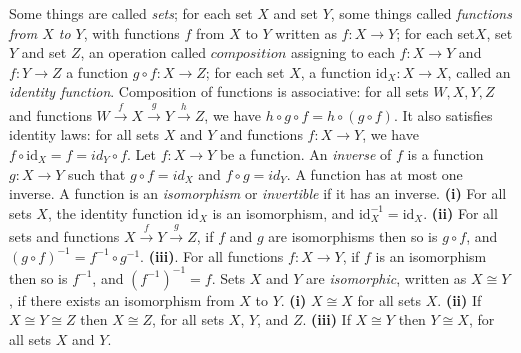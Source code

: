  Some things are called \textit{sets}; for each set $X$ and set $Y$, some things called \textit{functions from $X$ to $Y$}, with functions $f$ from $X$ to $Y$ written as $f \colon X \to Y$; for each set$X$, set $Y$ and set $Z$, an operation called $composition$ assigning to each $f \colon X \to Y$ and $f \colon Y \to Z$ a function $g \circ f \colon X \to Z$; for each set $X$, a function $\text{id}_X \colon X \to X$, called an \textit{identity function}.
 Composition of functions is associative: for all sets $W, X, Y, Z$ and functions $W \xrightarrow{f} X \xrightarrow{g} Y \xrightarrow{h} Z$, we have $h \circ g \circ f = h \circ (g \circ f)$. It also satisfies identity laws: for all sets $X$ and $Y$ and functions $f \colon X \to Y$, we have $f \circ \text{id}_X = f = id_Y \circ f$.
 Let $f \colon X \to Y$ be a function. An \textit{inverse} of $f$ is a function $g \colon X \to Y$ such that $g \circ f = id_X$ and $f \circ g = id_Y$.
 A function has at most one inverse.
 A function is an \textit{isomorphism} or \textit{invertible} if it has an inverse.
 \textbf{(i)} For all sets $X$, the identity function $\text{id}_X$ is an isomorphism, and $\text{id}_X^{-1} = \text{id}_X$. \textbf{(ii)} For all sets and functions $X \xrightarrow{f} Y \xrightarrow{g} Z$, if $f$ and $g$ are isomorphisms then so is $g \circ f$, and $(g \circ f)^{-1} = f^{-1} \circ g^{-1}$. \textbf{(iii)}. For all functions $f \colon X \to Y$, if $f$ is an isomorphism then so is $f^{-1}$, and
$(f^{-1})^{-1} = f$.
 Sets $X$ and $Y$ are \textit{isomorphic}, written as $X \cong Y$, if there exists an isomorphism from $X$ to $Y$.
 \textbf{(i)} $X \cong X$ for all sets $X$. \textbf{(ii)} If $X \cong Y \cong Z$ then $X \cong Z$, for all sets $X$, $Y$, and $Z$. \textbf{(iii)} If $X \cong Y$ then $Y \cong X$, for all sets $X$ and $Y$.
